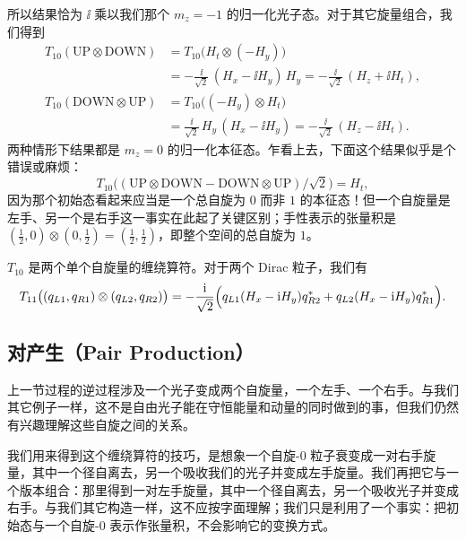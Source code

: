 所以结果恰为 $\ii$ 乘以我们那个 $m_z=-1$ 的归一化光子态。对于其它旋量组合，我们得到
\begin{align*}
T_{10}(\text{UP}\otimes\text{DOWN})
&= T_{10}\bigl(H_t\otimes(-H_y)\bigr)\\
&= -\frac{\ii}{\sqrt2}\,(H_x-\ii H_y)\,H_y
= -\frac{\ii}{\sqrt2}\,(H_z+\ii H_t),\\
T_{10}(\text{DOWN}\otimes\text{UP})
&= T_{10}\bigl((-H_y)\otimes H_t\bigr)\\
&= \frac{\ii}{\sqrt2}\,H_y\,(H_x-\ii H_y)
= -\frac{\ii}{\sqrt2}\,(H_z-\ii H_t).
\end{align*}
两种情形下结果都是 $m_z=0$ 的归一化本征态。乍看上去，下面这个结果似乎是个错误或麻烦：
\begin{equation*}
T_{10}\bigl((\text{UP}\otimes\text{DOWN}-\text{DOWN}\otimes\text{UP})/\sqrt2\bigr)=H_t,
\end{equation*}
因为那个初始态看起来应当是一个总自旋为 0 而非 $1$ 的本征态！但一个自旋量是左手、另一个是右手这一事实在此起了关键区别；手性表示的张量积是 $(\tfrac12,0)\otimes(0,\tfrac12)=(\tfrac12,\tfrac12)$，即整个空间的总自旋为 $1$。

$T_{10}$ 是两个单个自旋量的缠绕算符。对于两个 Dirac 粒子，我们有
\begin{equation*}
T_{11}\bigl((q_{L1},q_{R1})\otimes(q_{L2},q_{R2})\bigr)
=-\frac{\mathrm{i}}{\sqrt2}\Bigl(q_{L1}(H_x-\mathrm{i} H_y)q_{R2}^*+q_{L2}(H_x-\mathrm{i} H_y)q_{R1}^*\Bigr).
\end{equation*}

\subsection{对产生（Pair Production）}


上一节过程的逆过程涉及一个光子变成两个自旋量，一个左手、一个右手。与我们其它例子一样，这不是自由光子能在守恒能量和动量的同时做到的事，但我们仍然有兴趣理解这些自旋之间的关系。

我们用来得到这个缠绕算符的技巧，是想象一个自旋-0 粒子衰变成一对右手旋量，其中一个径自离去，另一个吸收我们的光子并变成左手旋量。我们再把它与一个版本组合：那里得到一对左手旋量，其中一个径自离去，另一个吸收光子并变成右手。与我们其它构造一样，这不应按字面理解；我们只是利用了一个事实：把初始态与一个自旋-0 表示作张量积，不会影响它的变换方式。

